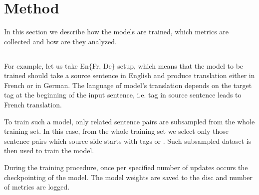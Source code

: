 \subsection{}
\label{subsection:en-to-5}

\cite{eisele-chen-2010-multiun}


\section{Method}
\label{section:method}

In this section we describe how the models are trained, which metrics
are collected and how are they analyzed.

\subsection{}

For example, let us take En\to{}$\{$Fr, De$\}$ setup, which means that
the model to be trained should take a source sentence in English and
produce translation either in French or in German.
The language of model's translation depends on the target tag at the beginning
of the input sentence, i.e.  tag in source sentence leads to French
translation.

To train such a model, only related sentence pairs are subsampled
from the whole training set.
In this case, from the whole training set we select only those sentence
pairs which source side starts with tags  or .
Such subsampled dataset is then used to train the model.

During the training procedure, once per specified number of updates
occurs the checkpointing of the model.
The model weights are saved to the disc and number of metrics are logged.

